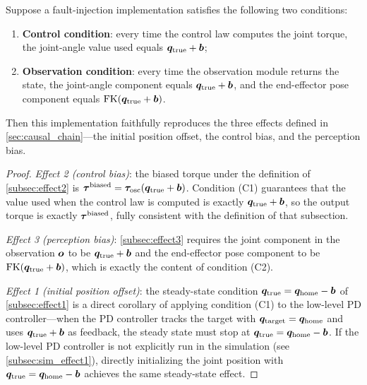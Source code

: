 \begin{proposition}\label{prop:injection}
Suppose a fault-injection implementation satisfies the following two conditions:
\begin{enumerate}
  \item[\textbf{\textup{(C1)}}] \textbf{Control condition}: every time the control law computes the joint torque, the joint-angle value used equals $\bm{q}_{\text{true}} + \bm{b}$;
  \item[\textbf{\textup{(C2)}}] \textbf{Observation condition}: every time the observation module returns the state, the joint-angle component equals $\bm{q}_{\text{true}} + \bm{b}$, and the end-effector pose component equals $\text{FK}(\bm{q}_{\text{true}} + \bm{b})$.
\end{enumerate}
Then this implementation faithfully reproduces the three effects defined in \cref{sec:causal_chain}---the initial position offset, the control bias, and the perception bias.
\end{proposition}

\begin{proof}
\emph{Effect 2 (control bias)}: the biased torque under the definition of \cref{subsec:effect2} is $\bm{\tau}^{\text{biased}} = \bm{\tau}_{\text{osc}}(\bm{q}_{\text{true}} + \bm{b})$. Condition (C1) guarantees that the value used when the control law is computed is exactly $\bm{q}_{\text{true}} + \bm{b}$, so the output torque is exactly $\bm{\tau}^{\text{biased}}$, fully consistent with the definition of that subsection.

\emph{Effect 3 (perception bias)}: \cref{subsec:effect3} requires the joint component in the observation $\bm{o}$ to be $\bm{q}_{\text{true}} + \bm{b}$ and the end-effector pose component to be $\text{FK}(\bm{q}_{\text{true}} + \bm{b})$, which is exactly the content of condition (C2).

\emph{Effect 1 (initial position offset)}: the steady-state condition $\bm{q}_{\text{true}} = \bm{q}_{\text{home}} - \bm{b}$ of \cref{subsec:effect1} is a direct corollary of applying condition (C1) to the low-level PD controller---when the PD controller tracks the target with $\bm{q}_{\text{target}} = \bm{q}_{\text{home}}$ and uses $\bm{q}_{\text{true}} + \bm{b}$ as feedback, the steady state must stop at $\bm{q}_{\text{true}} = \bm{q}_{\text{home}} - \bm{b}$. If the low-level PD controller is not explicitly run in the simulation (see \cref{subsec:sim_effect1}), directly initializing the joint position with $\bm{q}_{\text{true}} = \bm{q}_{\text{home}} - \bm{b}$ achieves the same steady-state effect.\end{proof}

